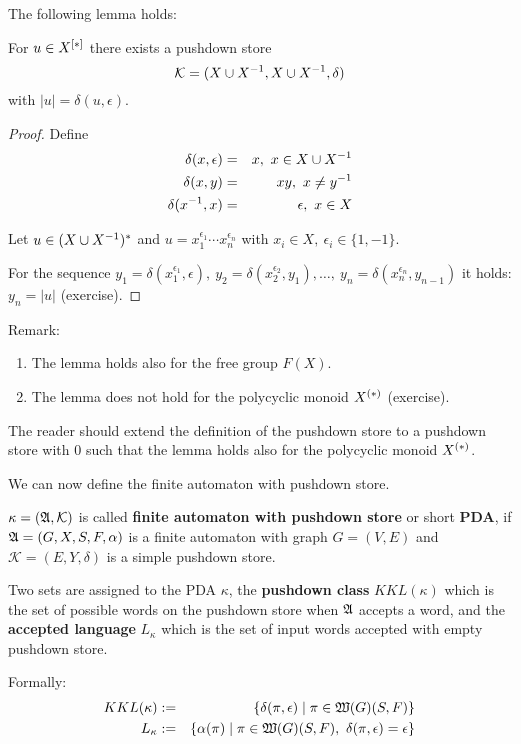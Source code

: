 The following lemma holds:
\begin{lemma}
For $u \in \mbox{${X}^{[*]}$}$ there exists a pushdown store
\[ \mathcal{K} =(X \cup {X}^{-1}, X \cup {X}^{-1}, \delta) \]
with $|u| = \delta(u, \epsilon)$.
\end{lemma}

\begin{proof}
Define
\begin{eqnarray*}
\delta(x, \epsilon) & = & x,\ x\in X \cup {X}^{-1}\\
\delta(x, y) & = & x y,\ x\neq y^{-1}\\
\delta(x^{-1}, x) & = & \epsilon,\ x\in X
\end{eqnarray*}

Let $u\in (X \cup {X}^{-1})^*$ and $u = x_1^{\epsilon_1} \cdots x_n^{\epsilon_n}$
with $x_i\in X,\ \epsilon_i\in \{1, -1\}$.

For the sequence $y_1 = \delta(x_1^{\epsilon_1}, \epsilon),\ y_2 =
\delta(x_2^{\epsilon_2}, y_1), \ldots,\ y_n = \delta(x_n^{\epsilon_n}, y_{n-1})$
it holds: $y_n = |u|$ (exercise).
\end{proof}

Remark:
\begin{enumerate}
  \item The lemma holds also for the free group $F(X)$.
  \item The lemma does not hold for the polycyclic monoid $\mbox{${X}^{(*)}$}$
  (exercise).
\end{enumerate}

The reader should extend the definition of the pushdown store to a
pushdown store with 0 such that the lemma holds also for the polycyclic monoid
$\mbox{${X}^{(*)}$}$.

We can now define the finite automaton with pushdown store.

\begin{definition}
$\kappa = (\mbox{$\mathfrak{A}$}, \mathcal{K})$ is called {\bf finite automaton with
pushdown store} or short {\bf PDA}, if $\mbox{$\mathfrak{A}$} = (G, X, S, F, \alpha)$ is a
finite automaton with graph $G = (V, E)$ and $\mathcal{K} = (E, Y,\delta)$ is a
simple pushdown store.
\end{definition}

Two sets are assigned to the PDA $\kappa$, the {\bf pushdown class}
$KKL(\kappa)$ which is the set of possible words on the pushdown store when
$\mbox{$\mathfrak{A}$}$ accepts a word, and the {\bf accepted language} $L_\kappa$ which is the
set of input words accepted with empty pushdown store.

Formally:
\begin{eqnarray*}
KKL(\kappa) &:=& \{ \delta(\pi, \epsilon) \mid \pi \in \mbox{$\mathfrak{W}(G)$}(S, F) \} \\
L_\kappa &:=& \{ \alpha(\pi) \mid \pi \in \mbox{$\mathfrak{W}(G)$}(S, F),\ \delta(\pi,
\epsilon) = \epsilon \}
\end{eqnarray*}

